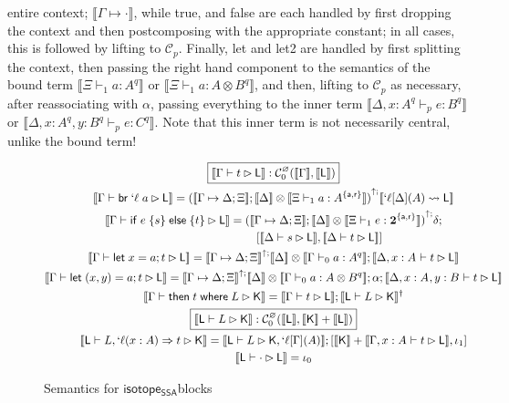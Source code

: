 \documentclass[acmsmall,screen,review]{acmart}
\newcommand{\mc}[1]{\ensuremath{\mathcal{#1}}}
\newcommand{\mb}[1]{\ensuremath{\mathbf{#1}}}
\newcommand{\ms}[1]{\ensuremath{\mathsf{#1}}}
\newcommand{\lbl}[1]{{`#1}}
\newcommand{\lto}{\Rightarrow}
\newcommand{\letstmt}[3]{\ensuremath{\ms{let}\;#1 = #2; #3}}
\newcommand{\brb}[2]{\ms{br}\;#1\;#2}
\newcommand{\lbrb}[2]{\brb{\lbl{#1}}{#2}}
\newcommand{\ite}[3]{\ms{if}\;#1\;\{#2\}\;\ms{else}\;\{#3\}}
\newcommand{\ewhere}[2]{\ms{then}\;#1\;\ms{where}\;#2}
\newcommand{\wbranch}[3]{#1(#2) \lto #3}
\newcommand{\lwbranch}[3]{\wbranch{\lbl{#1}}{#2}{#3}}
\newcommand{\csplits}[3]{#1 \mapsto #2;#3}
\newcommand{\cwk}[2]{#1 \mapsto #2}
\newcommand{\lwk}[2]{#1 \rightsquigarrow #2}
\newcommand{\thyp}[3]{#1: {#2}^{#3}}
\newcommand{\lhyp}[3]{#1[#2](#3)}
\newcommand{\llhyp}[3]{\lhyp{\lbl{#1}}{#2}{#3}}
\newcommand{\rle}[1]{{\scriptsize\textsf{#1}}}
\newcommand{\tint}{{\{\ms{a}, \ms{r}\}}}
\newcommand{\hasty}[5]{#1 \vdash_{#2} #3: {#4}^{#5}}
\newcommand{\haslb}[3]{#1 \vdash #2 \rhd #3}
\newcommand{\lhaslb}[3]{#1 \vdash #2 \rhd #3}
\newcommand{\dnt}[1]{\llbracket{#1}\rrbracket}
\newcommand{\upg}[2]{{#1}^{\uparrow #2}}
\newcommand{\isotopessa}{\ms{isotope_{SSA}}}
\begin{document}
entire context; \(\dnt{\cwk{\Gamma}{\cdot}}\), while \rle{true}, and \rle{false}
are each handled by first dropping the context and then postcomposing with the
appropriate constant; in all cases, this is followed by lifting to \(\mc{C}_p\).
Finally, \rle{let} and \rle{let2} are handled by first splitting the context,
then passing the right hand component to the semantics of the bound term
\(\dnt{\hasty{\Xi}{1}{a}{A}{q}}\) or \(\dnt{\hasty{\Xi}{1}{a}{A \otimes
B}{q}}\), and then, lifting to \(\mc{C}_p\) as necessary, after reassociating
with \(\alpha\), passing everything to the inner term \(\dnt{\hasty{\Delta,
\thyp{x}{A}{q}}{p}{e}{B}{q}}\) or \(\dnt{\hasty{\Delta, \thyp{x}{A}{q},
\thyp{y}{B}{q}}{p}{e}{C}{q}}\). Note that this inner term is not necessarily
central, unlike the bound term!

\begin{figure}
  \begin{gather*}
    \boxed{\dnt{\haslb{\Gamma}{t}{\ms{L}}}
      : \mc{C}_0^\varnothing(\dnt{\Gamma}, \dnt{\ms{L}})} \\
    \dnt{\haslb{\Gamma}{\lbrb{\ell}{a}}{\ms{L}}}
      = \upg{(\dnt{\csplits{\Gamma}{\Delta}{\Xi}}
      ; \dnt{\Delta} \otimes \dnt{\hasty{\Xi}{1}{a}{A}{\tint}})}
      ; \dnt{\lwk{\llhyp{\ell}{\Delta}{A}}{\ms{L}}} \\
    \dnt{\haslb{\Gamma}{\ite{e}{s}{t}}{\ms{L}}}
      = \upg{(\dnt{\csplits{\Gamma}{\Delta}{\Xi}}
      ; \dnt{\Delta} \otimes \dnt{\hasty{\Xi}{1}{e}{\mb{2}}{\tint}})}
      ; \delta ;
      \\ \qquad \qquad \qquad \qquad
      [
        \dnt{\haslb{\Delta}{s}{\ms{L}}}, 
        \dnt{\haslb{\Delta}{t}{\ms{L}}} 
      ]
      \\
    \dnt{\haslb{\Gamma}{\letstmt{x}{a}{t}}{\ms{L}}}
      = \upg{\dnt{\csplits{\Gamma}{\Delta}{\Xi}}}
      ; \dnt{\Delta} \otimes \dnt{\hasty{\Gamma}{0}{a}{A}{q}}
      ; \dnt{\haslb{\Delta, \thyp{x}{A}{}}{t}{\ms{L}}}
      \\
    \dnt{\haslb{\Gamma}{\letstmt{(x, y)}{a}{t}}{\ms{L}}}
      = \upg{\dnt{\csplits{\Gamma}{\Delta}{\Xi}}}
      ; \dnt{\Delta} \otimes \dnt{\hasty{\Gamma}{0}{a}{A \otimes B}{q}}
      ; \alpha
      ; \dnt{\haslb{\Delta, \thyp{x}{A}{}, \thyp{y}{B}{}}{t}{\ms{L}}}
      \\
    \dnt{\haslb{\Gamma}{\ewhere{t}{L}}{\ms{K}}}
      = \dnt{\haslb{\Gamma}{t}{\ms{L}}}
      ; \dnt{\lhaslb{\ms{L}}{L}{\ms{K}}}^\dagger
      \\
    \boxed{\dnt{\lhaslb{\ms{L}}{L}{\ms{K}}}
      : \mc{C}_0^\varnothing(\dnt{\ms{L}}, \dnt{\ms{K}} + \dnt{\ms{L}})}
      \\
    \dnt{\lhaslb{\ms{L}}{L, \lwbranch{\ell}{x: A}{t}}{\ms{K}}}
      = \dnt{\lhaslb{\ms{L}}{L}{\ms{K}, \llhyp{\ell}{\Gamma}{A}}}
      ; [\dnt{\ms{K}} + \dnt{\haslb{\Gamma, \thyp{x}{A}{}}{t}{\ms{L}}}, \iota_1]
      \\
    \dnt{\lhaslb{\ms{L}}{\cdot}{\ms{L}}}
      = \iota_0
  \end{gather*}
  \caption{Semantics for \isotopessa blocks}
  \label{fig:ssa-block-semantics}
\end{figure}
\end{document}
